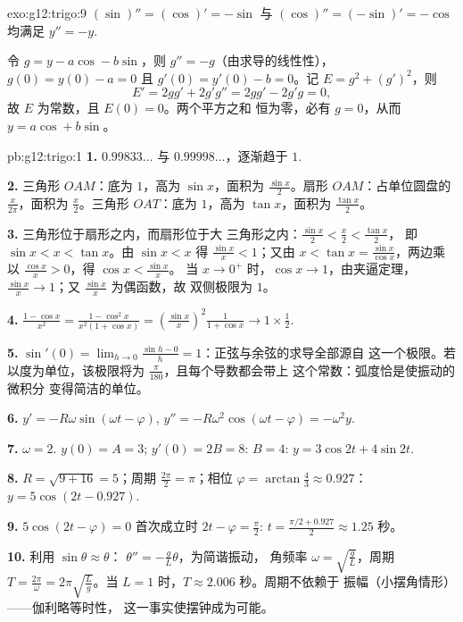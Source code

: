\begin{solution}{exo:g12:trigo:9}
$(\sin)'' = (\cos)' = -\sin$ 与 $(\cos)'' = (-\sin)' = -\cos$ 均满足
$y'' = -y$.

令 $g = y - a\cos - b\sin$，则 $g'' = -g$（由求导的线性性），
$g(0) = y(0) - a = 0$ 且 $g'(0) = y'(0) - b = 0$。记
$E = g^2 + (g')^2$，则
\[
E' = 2g g' + 2g' g'' = 2g g' - 2g' g = 0,
\]
故 $E$ 为常数，且 $E(0) = 0$。两个平方之和
恒为零，必有 $g = 0$，从而 $y = a\cos + b\sin$。
\end{solution}

\begin{solution}{pb:g12:trigo:1}
\textbf{1.} $0.99833\ldots$ 与 $0.99998\ldots$，逐渐趋于
$1$.

\textbf{2.} 三角形 $OAM$：底为 $1$，高为 $\sin x$，面积为
$\frac{\sin x}{2}$。扇形 $OAM$：占单位圆盘的
$\frac{x}{2\pi}$，面积为 $\frac x2$。三角形
$OAT$：底为 $1$，高为 $\tan x$，面积为 $\frac{\tan x}{2}$。

\textbf{3.} 三角形位于扇形之内，而扇形位于大
三角形之内：$\frac{\sin x}{2} < \frac x2 < \frac{\tan x}{2}$，
即 $\sin x < x < \tan x$。由 $\sin x < x$ 得
$\frac{\sin x}{x} < 1$；又由
$x < \tan x = \frac{\sin x}{\cos x}$，两边乘以
$\frac{\cos x}{x} > 0$，得 $\cos x < \frac{\sin x}{x}$。
当 $x \to 0^+$ 时，$\cos x \to 1$，由夹逼定理，
$\frac{\sin x}{x} \to 1$；又 $\frac{\sin x}{x}$ 为偶函数，故
双侧极限为 $1$。

\textbf{4.} $\frac{1 - \cos x}{x^2} =
\frac{1 - \cos^2 x}{x^2 (1 + \cos x)} =
\left(\frac{\sin x}{x}\right)^2 \frac{1}{1 + \cos x}
\to 1 \times \frac12$.

\textbf{5.} $\sin'(0) = \lim_{h \to 0} \frac{\sin h - 0}{h} =
1$：正弦与余弦的求导全部源自
这一个极限。若以度为单位，该极限将为
$\frac{\pi}{180}$，且每个导数都会带上
这个常数：弧度恰是使振动的微积分
变得简洁的单位。

\textbf{6.} $y' = -R\omega\sin(\omega t - \varphi)$,
$y'' = -R\omega^2\cos(\omega t - \varphi) = -\omega^2 y$.

\textbf{7.} $\omega = 2$. $y(0) = A = 3$;
$y'(0) = 2B = 8$: $B = 4$: $y = 3\cos 2t + 4\sin 2t$.

\textbf{8.} $R = \sqrt{9 + 16} = 5$；周期
$\frac{2\pi}{2} = \pi$；相位
$\varphi = \arctan\frac43 \approx 0.927$：
$y = 5\cos(2t - 0.927)$.

\textbf{9.} $5\cos(2t - \varphi) = 0$ 首次成立时
$2t - \varphi = \frac\pi2$:
$t = \frac{\pi/2 + 0.927}{2} \approx 1.25$ 秒。

\textbf{10.} 利用 $\sin\theta \approx \theta$：
$\theta'' = -\frac gL \theta$，为简谐振动，
角频率 $\omega = \sqrt{\frac gL}$，周期
$T = \frac{2\pi}{\omega} = 2\pi\sqrt{\frac Lg}$。当
$L = 1$ 时，$T \approx 2.006$ 秒。周期不依赖于
振幅（小摆角情形）——伽利略等时性，
这一事实使摆钟成为可能。


\end{solution}
